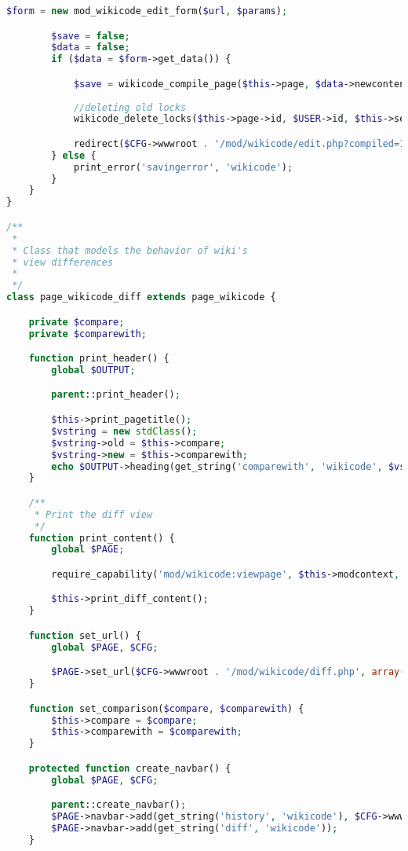 \begin{lstlisting}[language=PHP]
        $form = new mod_wikicode_edit_form($url, $params);

        $save = false;
        $data = false;
        if ($data = $form->get_data()) {

            $save = wikicode_compile_page($this->page, $data->newcontent, $USER->id, $this->download);
      
            //deleting old locks
            wikicode_delete_locks($this->page->id, $USER->id, $this->section);

            redirect($CFG->wwwroot . '/mod/wikicode/edit.php?compiled=1&pageid=' . $this->page->id);
        } else {
            print_error('savingerror', 'wikicode');
        }
    }
}

/**
 *
 * Class that models the behavior of wiki's
 * view differences
 *
 */
class page_wikicode_diff extends page_wikicode {

    private $compare;
    private $comparewith;

    function print_header() {
        global $OUTPUT;

        parent::print_header();

        $this->print_pagetitle();
        $vstring = new stdClass();
        $vstring->old = $this->compare;
        $vstring->new = $this->comparewith;
        echo $OUTPUT->heading(get_string('comparewith', 'wikicode', $vstring));
    }

    /**
     * Print the diff view
     */
    function print_content() {
        global $PAGE;

        require_capability('mod/wikicode:viewpage', $this->modcontext, NULL, true, 'noviewpagepermission', 'wikicode');

        $this->print_diff_content();
    }

    function set_url() {
        global $PAGE, $CFG;

        $PAGE->set_url($CFG->wwwroot . '/mod/wikicode/diff.php', array('pageid' => $this->page->id, 'comparewith' => $this->comparewith, 'compare' => $this->compare));
    }

    function set_comparison($compare, $comparewith) {
        $this->compare = $compare;
        $this->comparewith = $comparewith;
    }

    protected function create_navbar() {
        global $PAGE, $CFG;

        parent::create_navbar();
        $PAGE->navbar->add(get_string('history', 'wikicode'), $CFG->wwwroot . '/mod/wikicode/history.php?pageid' . $this->page->id);
        $PAGE->navbar->add(get_string('diff', 'wikicode'));
    }


\end{lstlisting}
